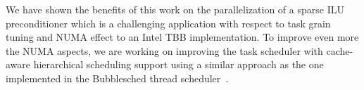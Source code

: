 We have shown the benefits of this work on the parallelization of a sparse ILU
preconditioner which is a challenging application with respect to task grain tuning and NUMA effect
to an Intel TBB implementation. 
%
To improve even more the NUMA aspects, we are working on improving the task
scheduler with cache-aware hierarchical scheduling support using a similar
approach as the one implemented in the Bubblesched thread scheduler~\cite{bubblesched}.

